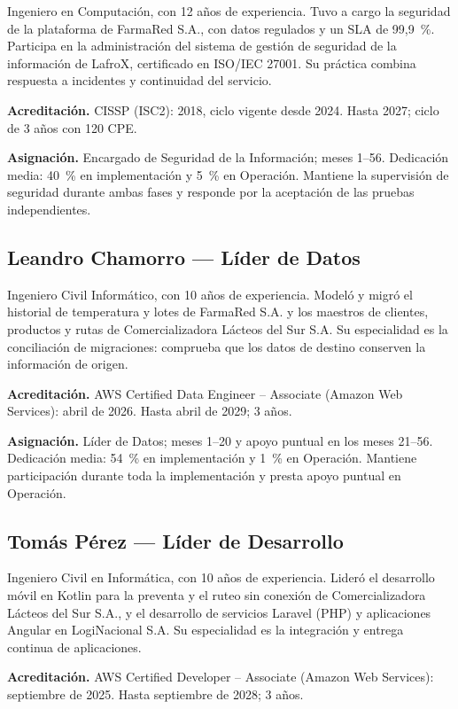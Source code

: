 Ingeniero en Computación, con 12 años de experiencia. Tuvo a cargo la seguridad de la plataforma de FarmaRed S.A., con datos regulados y un SLA de 99,9~\%. Participa en la administración del sistema de gestión de seguridad de la información de LafroX, certificado en ISO/IEC 27001. Su práctica combina respuesta a incidentes y continuidad del servicio.

\textbf{Acreditación.} CISSP (ISC2): 2018, ciclo vigente desde 2024. Hasta 2027; ciclo de 3 años con 120 CPE.

\textbf{Asignación.} Encargado de Seguridad de la Información; meses 1--56. Dedicación media: 40~\% en implementación y 5~\% en Operación. Mantiene la supervisión de seguridad durante ambas fases y responde por la aceptación de las pruebas independientes.

\subsection{Leandro Chamorro — Líder de Datos}

Ingeniero Civil Informático, con 10 años de experiencia. Modeló y migró el historial de temperatura y lotes de FarmaRed S.A. y los maestros de clientes, productos y rutas de Comercializadora Lácteos del Sur S.A. Su especialidad es la conciliación de migraciones: comprueba que los datos de destino conserven la información de origen.

\textbf{Acreditación.} AWS Certified Data Engineer -- Associate (Amazon Web Services): abril de 2026. Hasta abril de 2029; 3 años.

\textbf{Asignación.} Líder de Datos; meses 1--20 y apoyo puntual en los meses 21--56. Dedicación media: 54~\% en implementación y 1~\% en Operación. Mantiene participación durante toda la implementación y presta apoyo puntual en Operación.

\subsection{Tomás Pérez — Líder de Desarrollo}

Ingeniero Civil en Informática, con 10 años de experiencia. Lideró el desarrollo móvil en Kotlin para la preventa y el ruteo sin conexión de Comercializadora Lácteos del Sur S.A., y el desarrollo de servicios Laravel (PHP) y aplicaciones Angular en LogiNacional S.A. Su especialidad es la integración y entrega continua de aplicaciones.

\textbf{Acreditación.} AWS Certified Developer -- Associate (Amazon Web Services): septiembre de 2025. Hasta septiembre de 2028; 3 años.

